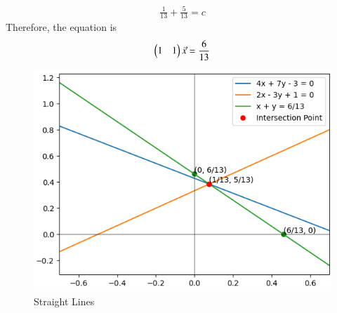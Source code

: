 \documentclass[12pt]{article}
\begin{document}
\begin{enumerate}
\begin{align}
    \frac{1}{13}+\frac{5}{13} = c
    \end{align}
    Therefore, the equation is \begin{align}
        \begin{pmatrix}1&1\end{pmatrix}\Vec{x}=\frac{6}{13}
    \end{align}
\begin{figure}[h]
    \centering
    \includegraphics[width=\columnwidth]{figs/straightline.png}
    \caption{Straight Lines}
    \label{fig:enter-label}
\end{figure}
\end{enumerate}
\end{document}
